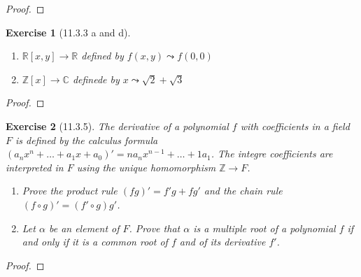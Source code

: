 \documentclass[12pt]{article}
\newtheorem*{exer}{Exercise}
\begin{document}
\begin{proof}
\end{proof}


\begin{exer}[11.3.3 a and d]

    \begin{enumerate}
        \item $\mathbb{R}[x, y] \rightarrow \mathbb{R}$ defined by $f(x,
            y) \leadsto f(0, 0)$

        \item $\mathbb{Z}[x] \rightarrow \mathbb{C}$ definede by $x
            \leadsto \sqrt{2} + \sqrt{3}$

    \end{enumerate}
\end{exer}

\begin{proof}
\end{proof}


\begin{exer}[11.3.5]

    The derivative of a polynomial $f$ with coefficients in a field $F$
    is defined by the calculus formula $(a_n x^n + \dots + a_1 x + a_0)'
    = n a_n x^{n-1} + \dots + 1 a_1$. The integre coefficients are
    interpreted in $F$ using the unique homomorphism $\mathbb{Z}
    \rightarrow F$.

    \begin{enumerate}
        \item Prove the product rule $(fg)' = f'g + fg'$ and the chain
            rule $(f \circ g)' = (f' \circ g)g'$.

        \item Let $\alpha$ be an element of $F$. Prove that $\alpha$ is
            a multiple root of a polynomial $f$ if and only if it is a
            common root of $f$ and of its derivative $f'$.

    \end{enumerate}
\end{exer}

\begin{proof}
\end{proof}

\end{document}

